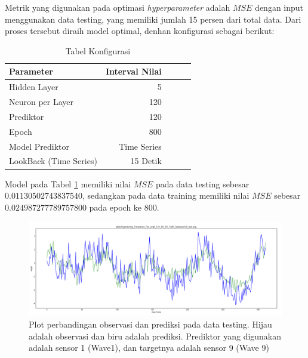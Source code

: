 Metrik yang digunakan pada optimasi \emph{hyperparameter} adalah $MSE$ dengan input menggunakan data testing, yang memiliki jumlah 15 persen dari total data. Dari proses tersebut diraih model optimal, denhan konfigurasi sebagai berikut:
\FloatBarrier
\begin{table}[h]
  \caption{Tabel Konfigurasi}
  \label{tab:modelOptimal}
  \begin{center}
    \begin{tabular}{lrrrr}
      \toprule
      Parameter &        Interval Nilai \\
      \midrule
      Hidden Layer            & 5    \\
      Neuron per Layer        & 120    \\
      Prediktor               & 120    \\
      Epoch                   & 800  \\
      Model Prediktor         & Time Series \\
      LookBack (Time Series)  & 15 Detik \\
      \bottomrule
    \end{tabular}
  \end{center}
\end{table}
\FloatBarrier
\noindent Model pada Tabel \ref{tab:modelOptimal} memiliki nilai $MSE$ pada data testing sebesar $0.01130502743837540$, sedangkan pada data training memiliki nilai $MSE$ sebesar $0.024987277789757800$ pada epoch ke 800.
\FloatBarrier
\begin{figure}[h]
  \includegraphics[scale=0.34]{./images/Hypertuning_Timeseries_Par_avg5_0,1I_9O_5H_120N_lookback120_test.png}
  \caption{Plot perbandingan observasi dan prediksi pada data testing. Hijau adalah observasi dan biru adalah prediksi. Prediktor yang digunakan adalah sensor 1 (Wave1), dan targetnya adalah sensor 9 (Wave 9)}
  \label{fig:perbandinganTestTerbaik}
\end{figure}

